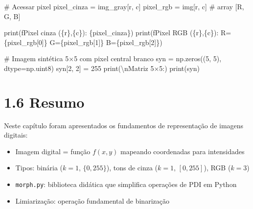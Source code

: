 \documentclass[
  portuguese,
  letterpaper,
  openany,
  oneside,
  12pt,
  a4paper]{book}
\newenvironment{Shaded}{\begin{snugshade}}{\end{snugshade}}
\newcommand{\BuiltInTok}[1]{\textcolor[rgb]{0.00,0.23,0.31}{#1}}
\newcommand{\CharTok}[1]{\textcolor[rgb]{0.13,0.47,0.30}{#1}}
\newcommand{\CommentTok}[1]{\textcolor[rgb]{0.37,0.37,0.37}{#1}}
\newcommand{\DecValTok}[1]{\textcolor[rgb]{0.68,0.00,0.00}{#1}}
\newcommand{\NormalTok}[1]{\textcolor[rgb]{0.00,0.23,0.31}{#1}}
\newcommand{\OperatorTok}[1]{\textcolor[rgb]{0.37,0.37,0.37}{#1}}
\newcommand{\SpecialCharTok}[1]{\textcolor[rgb]{0.37,0.37,0.37}{#1}}
\newcommand{\SpecialStringTok}[1]{\textcolor[rgb]{0.13,0.47,0.30}{#1}}
\newcommand{\StringTok}[1]{\textcolor[rgb]{0.13,0.47,0.30}{#1}}
\providecommand{\tightlist}{%
  \setlength{\itemsep}{0pt}\setlength{\parskip}{0pt}}
\begin{document}
\begin{tcolorbox}
\begin{Shaded}
\begin{Highlighting}[]
\CommentTok{\# Acessar pixel}
\NormalTok{pixel\_cinza }\OperatorTok{=}\NormalTok{ img\_gray[r, c]}
\NormalTok{pixel\_rgb   }\OperatorTok{=}\NormalTok{ img[r, c]       }\CommentTok{\# array [R, G, B]}

\BuiltInTok{print}\NormalTok{(}\SpecialStringTok{f\textquotesingle{}Pixel cinza (}\SpecialCharTok{\{}\NormalTok{r}\SpecialCharTok{\}}\SpecialStringTok{,}\SpecialCharTok{\{}\NormalTok{c}\SpecialCharTok{\}}\SpecialStringTok{): }\SpecialCharTok{\{}\NormalTok{pixel\_cinza}\SpecialCharTok{\}}\SpecialStringTok{\textquotesingle{}}\NormalTok{)}
\BuiltInTok{print}\NormalTok{(}\SpecialStringTok{f\textquotesingle{}Pixel RGB   (}\SpecialCharTok{\{}\NormalTok{r}\SpecialCharTok{\}}\SpecialStringTok{,}\SpecialCharTok{\{}\NormalTok{c}\SpecialCharTok{\}}\SpecialStringTok{): R=}\SpecialCharTok{\{}\NormalTok{pixel\_rgb[}\DecValTok{0}\NormalTok{]}\SpecialCharTok{\}}\SpecialStringTok{  G=}\SpecialCharTok{\{}\NormalTok{pixel\_rgb[}\DecValTok{1}\NormalTok{]}\SpecialCharTok{\}}\SpecialStringTok{  B=}\SpecialCharTok{\{}\NormalTok{pixel\_rgb[}\DecValTok{2}\NormalTok{]}\SpecialCharTok{\}}\SpecialStringTok{\textquotesingle{}}\NormalTok{)}

\CommentTok{\# Imagem sintética 5×5 com pixel central branco}
\NormalTok{syn }\OperatorTok{=}\NormalTok{ np.zeros((}\DecValTok{5}\NormalTok{, }\DecValTok{5}\NormalTok{), dtype}\OperatorTok{=}\NormalTok{np.uint8)}
\NormalTok{syn[}\DecValTok{2}\NormalTok{, }\DecValTok{2}\NormalTok{] }\OperatorTok{=} \DecValTok{255}
\BuiltInTok{print}\NormalTok{(}\StringTok{\textquotesingle{}}\CharTok{\textbackslash{}n}\StringTok{Matriz 5×5:\textquotesingle{}}\NormalTok{)}
\BuiltInTok{print}\NormalTok{(syn)}
\end{Highlighting}
\end{Shaded}

\section{1.6 Resumo}\label{resumo-1}

Neste capítulo foram apresentados os fundamentos de representação de
imagens digitais:

\begin{itemize}
\tightlist
\item
  Imagem digital = função \(f(x,y)\) mapeando coordenadas para
  intensidades
\item
  Tipos: binária (\(k=1\), \(\{0,255\}\)), tons de cinza (\(k=1\),
  \([0,255]\)), RGB (\(k=3\))
\item
  \texttt{morph.py}: biblioteca didática que simplifica operações de PDI
  em Python
\item
  Limiarização: operação fundamental de binarização
\end{itemize}


\end{tcolorbox}
\end{document}
